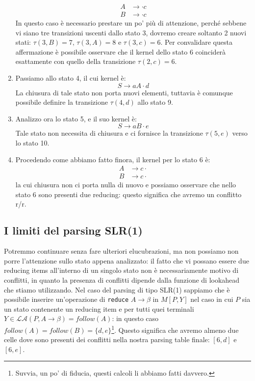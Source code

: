 \documentclass[class=book, crop=false, oneside, 12pt]{standalone}
\begin{document}
\begin{enumerate}
    \begin{align*}
        A &\to \cdot c \\
        B &\to \cdot c
    \end{align*}
    In questo caso è necessario prestare un po' più di attenzione, perché sebbene vi siano tre transizioni uscenti dallo stato 3, dovremo creare soltanto 2 nuovi stati: \(\tau(3,B)=7 \textrm{, } \tau(3,A)=8 \textrm{ e } \tau(3,c)=6\). Per convalidare questa affermazione è possibile osservare che il kernel dello stato 6 coinciderà esattamente con quello della transizione \(\tau(2, c)=6\).
    \item Passiamo allo stato 4, il cui kernel è:
    \begin{equation*}
        S \to aA \cdot d 
    \end{equation*}
   La chiusura di tale stato non porta nuovi elementi, tuttavia è comunque possibile definire la transizione \(\tau(4,d)\) allo stato 9.
    \item Analizzo ora lo stato 5, e il suo kernel è:
    \begin{equation*}
        S \to aB \cdot e
    \end{equation*}
    Tale stato non necessita di chiusura e ci fornisce la transizione \(\tau(5,e)\) verso lo stato 10.
    \item Procedendo come abbiamo fatto finora, il kernel per lo stato 6 è:
    \begin{align*}
        A &\to c \cdot \\
        B &\to c \cdot
    \end{align*}
    la cui chiusura non ci porta nulla di nuovo e possiamo osservare che nello stato 6 sono presenti due reducing: questo significa che avremo un conflitto r/r.
\end{enumerate}

\subsection{I limiti del parsing SLR(1)}
Potremmo continuare senza fare ulteriori elucubrazioni, ma non possiamo non porre l'attenzione sullo stato appena analizzato: il fatto che vi possano essere due reducing items all'interno di un singolo stato non è necessariamente motivo di conflitti, in quanto la presenza di conflitti dipende dalla funzione di lookahead che stiamo utilizzando. Nel caso del parsing di tipo SLR(1) sappiamo che è possibile inserire un'operazione di \texttt{reduce} \(A \rightarrow \beta\) in \(M[P, Y]\) nel caso in cui \(P\) sia un stato contenente un reducing item e per tutti quei terminali \(Y \in \mathcal{LA}(P, A \rightarrow \beta) = follow(A)\): in questo caso \(follow(A) = follow(B) = \{d, e\}\)\footnote{Suvvia, un po' di fiducia, questi calcoli li abbiamo fatti davvero.}.
Questo significa che avremo almeno due celle dove sono presenti dei conflitti nella nostra parsing table finale: \([6, d]\) e \([6, e]\).
\end{document}
